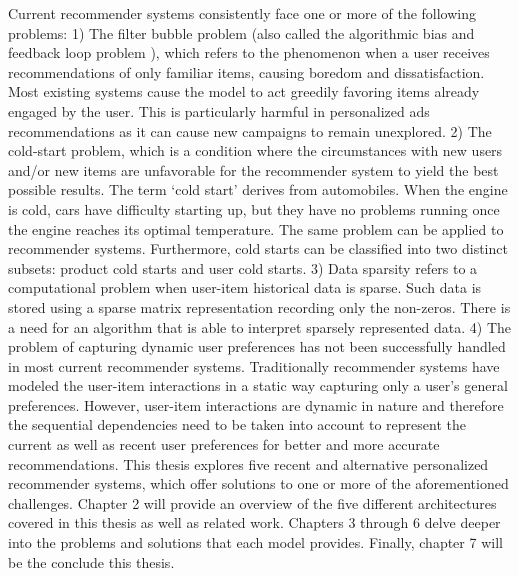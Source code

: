 Current recommender systems consistently face one or more of the following problems: 1) The filter bubble problem (also called the algorithmic bias and feedback loop problem ), which refers to the phenomenon when a user receives recommendations of only familiar items, causing boredom and dissatisfaction. Most existing systems cause the model to act greedily favoring items already engaged by the user. This is particularly harmful in personalized ads recommendations as it can cause new campaigns to remain unexplored. 2) The cold-start problem, which is a condition where the circumstances  with new users and/or new items are unfavorable for the recommender system to yield the best possible results. The term ‘cold start’ derives from automobiles. When the engine is cold, cars have difficulty starting up, but they have no problems running once the engine reaches its optimal temperature. The same problem can be applied to recommender systems. Furthermore, cold starts can be classified into two distinct subsets: product cold starts and user cold starts. 3) Data sparsity refers to a computational problem  when user-item historical data is sparse. Such data is stored using a sparse matrix representation recording only the non-zeros. There is a need for an algorithm that is able to interpret sparsely represented data. 4) The problem of capturing dynamic user preferences has not been successfully handled in most current recommender systems. Traditionally recommender systems have modeled the user-item interactions in a static way capturing only a user’s general preferences. However, user-item interactions are dynamic in nature and therefore the sequential dependencies need to be taken into account to represent the current as well as recent user preferences for better and more accurate recommendations. This thesis explores five recent and alternative personalized recommender systems, which offer solutions to one or more of the aforementioned challenges. Chapter 2 will provide an overview of the five different architectures covered in this thesis as well as related work. Chapters 3 through 6 delve deeper into the problems and solutions that each model provides. Finally, chapter 7 will be the conclude this thesis.
